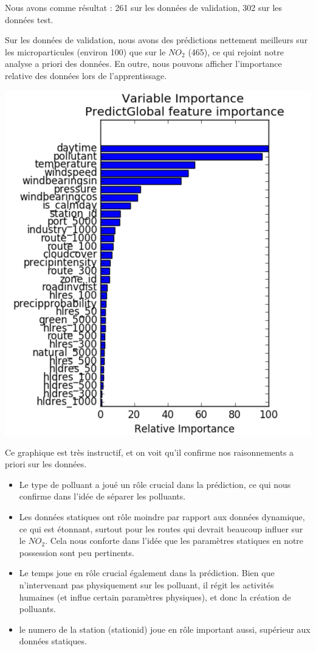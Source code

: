 Nous avons comme résultat : 261 sur les données de validation, 302 sur les données test.

Sur les données de validation, nous avons des prédictions nettement meilleurs sur les microparticules (environ 100) que sur le $NO_2$ (465), ce qui rejoint notre analyse a priori des données. En outre, nous pouvons afficher l'importance relative des données lors de l'apprentissage.

\begin{center}
	\includegraphics{images/importance feature global.png}
\end{center}

Ce graphique est très instructif, et on voit qu'il confirme nos raisonnements a priori sur les données. 
\begin{itemize}
	\item Le type de polluant a joué un rôle crucial dans la prédiction, ce qui nous confirme dans l'idée de séparer les polluants.
	\item Les données statiques ont rôle moindre par rapport aux données dynamique, ce qui est étonnant, surtout pour les routes qui devrait beaucoup influer sur le $NO_2$. Cela nous conforte dans l'idée que les paramètres statiques en notre possession sont peu pertinents.
	\item Le temps joue en rôle crucial également dans la prédiction. Bien que n'intervenant pas physiquement sur les polluant, il régit les activités humaines (et influe certain paramètres physiques), et donc la création de polluants.
	\item le numero de la station (stationid) joue en rôle important aussi, supérieur aux données statiques. %
\end{itemize} 


